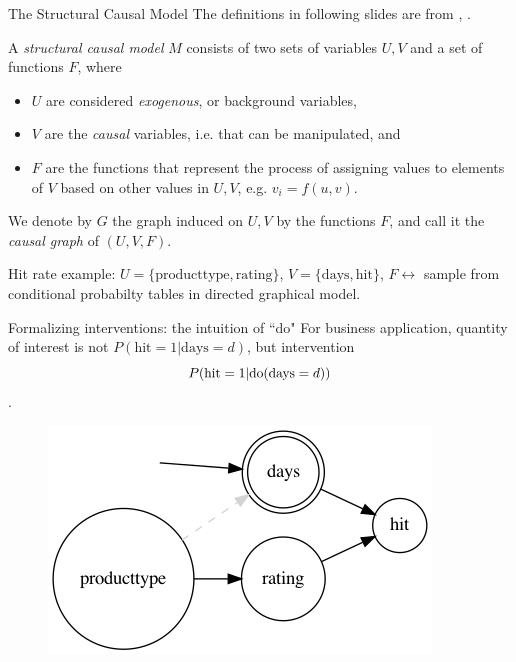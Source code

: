 \begin{frame}{The Structural Causal Model}
    The definitions in following slides are from \cite{pearl2007mathematics}, \cite{pearl2016causal}.
    \begin{definition}
        A \emph{structural causal model} $M$ consists of two sets of variables $U, V$ and a set of functions $F$, where

        \begin{itemize}
            \item $U$ are considered \emph{exogenous}, or background variables,
            \item $V$ are the \emph{causal} variables, i.e. that can be manipulated, and
            \item $F$ are the functions that represent the process of assigning values to elements of $V$ based on other values in $U, V$, e.g. $v_i = f(u, v)$.
        \end{itemize}

        We denote by $G$ the graph induced on $U, V$ by the functions $F$, and call it the \emph{causal graph} of $(U, V, F)$.\newline
    \end{definition}

    Hit rate example: $U = \{\textrm{producttype}, \textrm{rating}\}$, $V= \{\textrm{days}, \textrm{hit}\}$, $F\leftrightarrow$ sample from conditional probabilty tables in directed graphical model.
\end{frame}

\begin{frame}{Formalizing interventions: the intuition of ``do"}
    For business application, quantity of interest is not $P(\textrm{hit}=1 | \textrm{days}=d)$, but intervention $$P(\textrm{hit}=1 | \mathrm{do}(\textrm{days}=d))$$.\newline
    \begin{figure}[ht]
        \includegraphics[height=0.4\textwidth]{graphics/do_days}
    \end{figure}
\end{frame}

